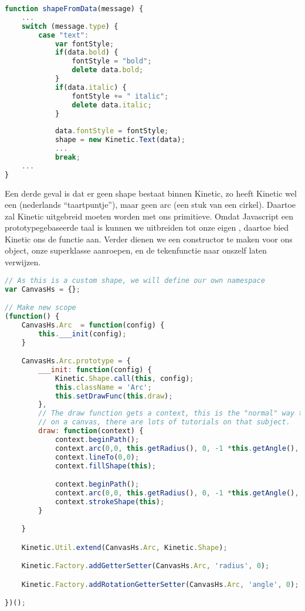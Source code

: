 \begin{lstlisting}[language=JavaScript]
function shapeFromData(message) {
	...
	switch (message.type) {
		case "text":
			var fontStyle;
			if(data.bold) {
				fontStyle = "bold";
				delete data.bold;
			}
			if(data.italic) {
				fontStyle += " italic";
				delete data.italic;
			}
			
			data.fontStyle = fontStyle;
			shape = new Kinetic.Text(data);
			...
			break;
	...
}
\end{lstlisting}

Een derde geval is dat er geen shape bestaat binnen Kinetic, zo heeft Kinetic wel een  (nederlands ``taartpuntje''), maar geen arc (een stuk van een cirkel). Daartoe zal Kinetic uitgebreid moeten worden met ons primitieve. Omdat Javascript een prototypegebaseerde taal is kunnen we  uitbreiden tot onze eigen , daartoe bied Kinetic ons de  functie aan. Verder dienen we een constructor te maken voor ons object, onze superklasse aanroepen, en de tekenfunctie naar onszelf laten verwijzen.

\begin{lstlisting}[style=densecode, language=JavaScript]
// As this is a custom shape, we will define our own namespace
var CanvasHs = {};

// Make new scope
(function() {
    CanvasHs.Arc  = function(config) {
        this.___init(config);
    }

    CanvasHs.Arc.prototype = {
        ___init: function(config) {
            Kinetic.Shape.call(this, config);
            this.className = 'Arc';
            this.setDrawFunc(this.draw);
        },
        // The draw function gets a context, this is the "normal" way to draw
        // on a canvas, there are lots of tutorials on that subject.
        draw: function(context) {
            context.beginPath();
            context.arc(0,0, this.getRadius(), 0, -1 *this.getAngle(), true);
            context.lineTo(0,0);
            context.fillShape(this);

            context.beginPath();
            context.arc(0,0, this.getRadius(), 0, -1 *this.getAngle(), true);
            context.strokeShape(this);
        }

    }

    Kinetic.Util.extend(CanvasHs.Arc, Kinetic.Shape);

    Kinetic.Factory.addGetterSetter(CanvasHs.Arc, 'radius', 0);

    Kinetic.Factory.addRotationGetterSetter(CanvasHs.Arc, 'angle', 0);

})();
\end{lstlisting}

